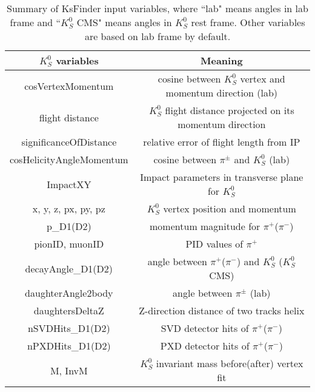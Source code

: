 \begin{table}[htbp]
	\centering 
	\small
	\begin{tabular}{|c|c|} 
		\hline
		$K_S^0$ variables &  Meaning \\
		\hline
		{cosVertexMomentum} & cosine between $K_S^0$ vertex and momentum direction (lab)\\
		flight distance & $K_S^0$ flight distance projected on its momentum direction\\
		significanceOfDistance & relative error of flight length from IP\\
		cosHelicityAngleMomentum & cosine between $\pi^{\pm}$ and $K_S^0$ (lab)\\
		ImpactXY & Impact parameters in transverse plane for $K_S^0$\\
		x, y, z, px, py, pz & $K_S^0$ vertex position and momentum\\
		p\_D1(D2) & momentum magnitude for $\pi^+$($\pi^-$)\\
		pionID, muonID & PID values of $\pi^+$\\
		decayAngle\_D1(D2) & angle between $\pi^+$($\pi^-$) and $K_S^0$ ($K_S^0$ CMS)\\
		daughterAngle2body & angle between $\pi^{\pm}$ (lab)\\
		daughtersDeltaZ & Z-direction distance of two tracks helix\\
		nSVDHits\_D1(D2)& SVD detector hits of  $\pi^+$($\pi^-$) \\
		nPXDHits\_D1(D2)& PXD detector hits of  $\pi^+$($\pi^-$) \\
		M, InvM & $K_S^0$ invariant mass before(after) vertex fit\\
		\hline
	\end{tabular}
	\caption{\small Summary of KsFinder input variables, where ``lab" means angles in lab frame and  ``$K_S^0$ CMS" means angles in $K_S^0$ rest frame. Other variables are based on lab frame by default. }
	\label{tab:ks_vars}
\end{table}

